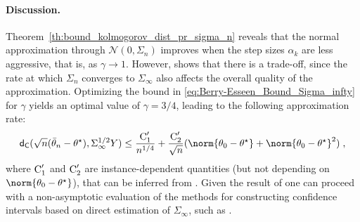 \paragraph{Discussion.} Theorem~\ref{th:bound_kolmogorov_dist_pr_sigma_n} reveals that the normal approximation through \(\mathcal{N}(0,\Sigma_n)\) improves when the step sizes \(\alpha_k\) are less aggressive, that is, as \(\gamma \to 1\). However,  shows that there is a trade-off, since the rate at which \(\Sigma_n\) converges to \(\Sigma_{\infty}\) also affects the overall quality of the approximation. Optimizing the bound in \eqref{eq:Berry-Esseen_Bound_Sigma_infty} for \(\gamma\) yields an optimal value of \(\gamma = 3/4\), leading to the following approximation rate:
\begin{align}
\label{eq:optimal_Berry-Esseen_Bound_Sigma_infty} 
\kolmogorov(\sqrt{n}(\bar\theta_n -\thetas), \Sigma_\infty^{1/2} Y)  \leq \frac{\ConstC_1^{\prime}}{n^{1/4}} + \frac{\ConstC_2^{\prime}}{\sqrt{n}}(\norm{\theta_0-\thetas}+\norm{\theta_0-\thetas}^2)\eqsp,
\end{align}
where $\operatorname{C}_1^{\prime}$ and $\operatorname{C}_2^{\prime}$ are instance-dependent quantities (but not depending on $\norm{\theta_0-\thetas}$), that can be inferred from . Given the result of  one can proceed with a non-asymptotic evaluation of the methods for constructing confidence intervals based on direct estimation of $\Sigma_{\infty}$, such as \cite{chen2020aos,zhu2023online_cov_matr}.  